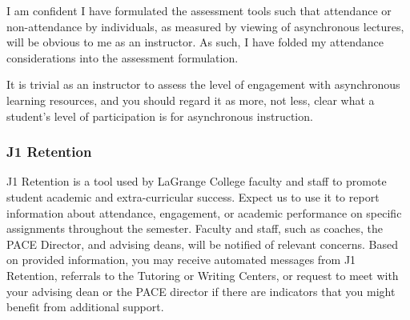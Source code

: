 \documentclass[11pt]{article}
\begin{document}
I am confident I have formulated the assessment tools such that attendance or non-attendance by individuals, as measured by viewing of asynchronous lectures, will be obvious to me as an instructor. As such, I have folded my attendance considerations into the assessment formulation.

It is trivial as an instructor to assess the level of engagement with asynchronous learning resources, and you should regard it as more, not less, clear what a student's level of participation is for asynchronous instruction.

\subsubsection*{J1 Retention}

J1 Retention is a tool used by LaGrange College faculty and staff to promote student academic and extra-curricular success. Expect us to use it to report information about attendance, engagement, or academic performance on specific assignments throughout the semester. Faculty and staff, such as coaches, the PACE Director, and advising deans, will be notified of relevant concerns. Based on provided information, you may receive automated messages from J1 Retention, referrals to the Tutoring or Writing Centers, or request to meet with your advising dean or the PACE director if there are indicators that you might benefit from additional support. 
\end{document}
